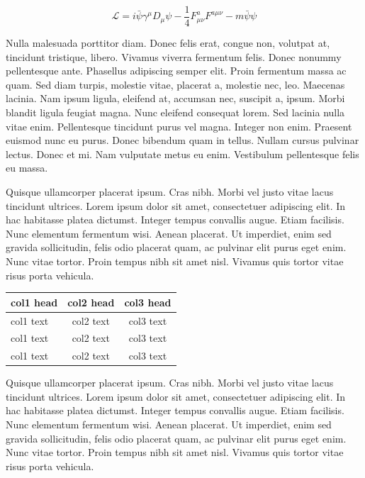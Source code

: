 \documentclass[APA,STIX1COL]{WileyNJD-v2}
\begin{document}
\begin{equation}
\mathcal{L} = i \bar{\psi} \gamma^\mu D_\mu \psi
    - \frac{1}{4} F_{\mu\nu}^a F^{a\mu\nu} - m \bar{\psi} \psi
\label{eq26}
\end{equation}

Nulla malesuada porttitor diam. Donec felis erat, congue non, volutpat at, tincidunt tristique, libero. Vivamus
viverra fermentum felis. Donec nonummy pellentesque ante. Phasellus adipiscing semper elit. Proin fermentum massa
ac quam. Sed diam turpis, molestie vitae, placerat a, molestie nec, leo. Maecenas lacinia. Nam ipsum ligula, eleifend
at, accumsan nec, suscipit a, ipsum. Morbi blandit ligula feugiat magna. Nunc eleifend consequat lorem. Sed lacinia
nulla vitae enim. Pellentesque tincidunt purus vel magna. Integer non enim. Praesent euismod nunc eu purus. Donec
bibendum quam in tellus. Nullam cursus pulvinar lectus. Donec et mi. Nam vulputate metus eu enim. Vestibulum
pellentesque felis eu massa.

Quisque ullamcorper placerat ipsum. Cras nibh. Morbi vel justo vitae lacus tincidunt ultrices. Lorem ipsum dolor sit
amet, consectetuer adipiscing elit. In hac habitasse platea dictumst. Integer tempus convallis augue. Etiam facilisis.
Nunc elementum fermentum wisi. Aenean placerat. Ut imperdiet, enim sed gravida sollicitudin, felis odio placerat
quam, ac pulvinar elit purus eget enim. Nunc vitae tortor. Proin tempus nibh sit amet nisl. Vivamus quis tortor
vitae risus porta vehicula.


\begin{center}
\begin{tabular*}{300pt}{@{\extracolsep\fill}lcc@{\extracolsep\fill}}%
\toprule
\textbf{col1 head} & \textbf{col2 head} & \textbf{col3 head} \\
\midrule
col1 text & col2 text & col3 text \\
col1 text & col2 text & col3 text \\
col1 text & col2 text & col3 text \\
\bottomrule
\end{tabular*}
\end{center}


Quisque ullamcorper placerat ipsum. Cras nibh. Morbi vel justo vitae lacus tincidunt ultrices. Lorem ipsum dolor sit
amet, consectetuer adipiscing elit. In hac habitasse platea dictumst. Integer tempus convallis augue. Etiam facilisis.
Nunc elementum fermentum wisi. Aenean placerat. Ut imperdiet, enim sed gravida sollicitudin, felis odio placerat
quam, ac pulvinar elit purus eget enim. Nunc vitae tortor. Proin tempus nibh sit amet nisl. Vivamus quis tortor
vitae risus porta vehicula.
\end{document}
